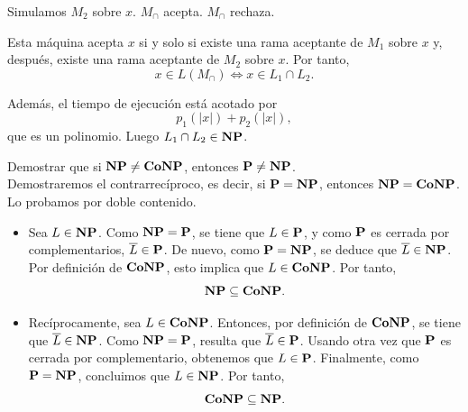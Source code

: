\begin{ejercicio}
\begin{algorithm}
\begin{algorithmic}
        \State Simulamos $M_2$ sobre $x$.
            \State $M_{\cap}$ acepta.
        \Else
            \State $M_{\cap}$ rechaza.
        \EndIf
    \end{algorithmic}
    \end{algorithm}

    Esta máquina acepta $x$ si y solo si existe una rama aceptante de $M_1$ sobre $x$ y,
    después, existe una rama aceptante de $M_2$ sobre $x$. Por tanto,
    $$
    x \in L(M_{\cap}) \iff x \in L_1 \cap L_2.
    $$

    Además, el tiempo de ejecución está acotado por
    $$
    p_1(|x|)+p_2(|x|),
    $$
    que es un polinomio. Luego $L_1 \cap L_2 \in \textbf{NP}$.
\end{ejercicio}

\begin{ejercicio}
    Demostrar que si $\textbf{NP} \neq \textbf{CoNP}$, entonces $\textbf{P} \neq \textbf{NP}$. \\

    Demostraremos el contrarrecíproco, es decir, si $\textbf{P} = \textbf{NP}$, entonces
    $\textbf{NP} = \textbf{CoNP}$. Lo probamos por doble contenido.
    
    \begin{itemize}
        \item[$\subseteq)$] Sea $L \in \textbf{NP}$. Como $\textbf{NP} = \textbf{P}$, se tiene que $L \in \textbf{P}$, y como $\textbf{P}$ es cerrada
            por complementarios, $\overline{L} \in \textbf{P}$. De nuevo, como $\textbf{P} = \textbf{NP}$, se deduce que
            $\overline{L} \in \textbf{NP}$. Por definición de $\textbf{CoNP}$, esto implica que $L \in \textbf{CoNP}$. Por tanto,
            $$\textbf{NP} \subseteq \textbf{CoNP}.$$
        \item[$(\supseteq$] Recíprocamente, sea $L \in \textbf{CoNP}$. Entonces, por definición de $\textbf{CoNP}$, se tiene que
            $\overline{L} \in \textbf{NP}$. Como $\textbf{NP} = \textbf{P}$, resulta que $\overline{L} \in \textbf{P}$. Usando otra vez
            que $\textbf{P}$ es cerrada por complementario, obtenemos que $L \in \textbf{P}$. Finalmente, como
            $\textbf{P} = \textbf{NP}$, concluimos que $L \in \textbf{NP}$. Por tanto,
            $$\textbf{CoNP} \subseteq \textbf{NP}.$$
    \end{itemize}
\end{ejercicio}

